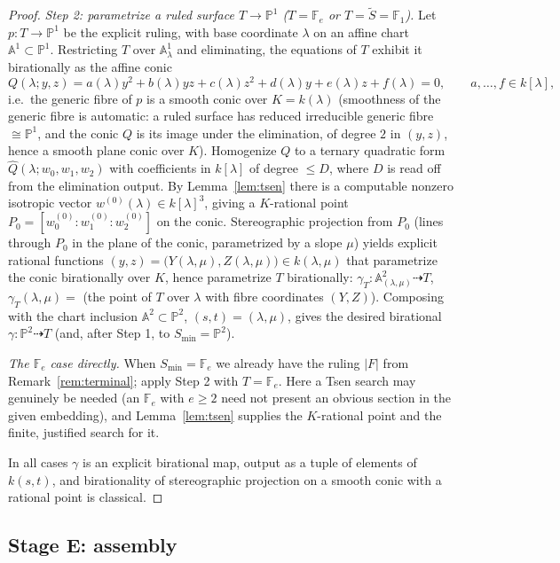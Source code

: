 \documentclass{amsart}
\theoremstyle{plain}
\theoremstyle{definition}
\newcommand{\PP}{\mathbb{P}}
\newcommand{\AA}{\mathbb{A}}
\begin{document}
\begin{proof}
\medskip
\emph{Step 2: parametrize a ruled surface $T\to\PP^1$ ($T=\mathbb F_e$ or
$T=\widetilde S=\mathbb F_1$).}
Let $p\colon T\to\PP^1$ be the explicit ruling, with base coordinate $\lambda$ on
an affine chart $\AA^1\subset\PP^1$.  Restricting $T$ over $\AA^1_\lambda$ and
eliminating, the equations of $T$ exhibit it birationally as the affine conic
\[
Q(\lambda;y,z)=a(\lambda)y^2+b(\lambda)yz+c(\lambda)z^2+d(\lambda)y+e(\lambda)z
+f(\lambda)=0,\qquad a,\dots,f\in k[\lambda],
\]
i.e.\ the generic fibre of $p$ is a smooth conic over $K=k(\lambda)$ (smoothness
of the generic fibre is automatic: a ruled surface has reduced irreducible
generic fibre $\cong\PP^1$, and the conic $Q$ is its image under the elimination,
of degree $2$ in $(y,z)$, hence a smooth plane conic over $K$).  Homogenize $Q$
to a ternary quadratic form $\widehat Q(\lambda;w_0,w_1,w_2)$ with coefficients
in $k[\lambda]$ of degree $\le D$, where $D$ is read off from the elimination
output.  By Lemma~\ref{lem:tsen} there is a computable nonzero isotropic vector
$w^{(0)}(\lambda)\in k[\lambda]^3$, giving a $K$-rational point
$P_0=[w_0^{(0)}:w_1^{(0)}:w_2^{(0)}]$ on the conic.  Stereographic projection
from $P_0$ (lines through $P_0$ in the plane of the conic, parametrized by a
slope $\mu$) yields explicit rational functions
$(y,z)=\big(Y(\lambda,\mu),Z(\lambda,\mu)\big)\in k(\lambda,\mu)$ that
parametrize the conic birationally over $K$, hence parametrize $T$ birationally:
$\gamma_T\colon \AA^2_{(\lambda,\mu)}\dashrightarrow T$,
$\gamma_T(\lambda,\mu)=$ (the point of $T$ over $\lambda$ with fibre coordinates
$(Y,Z)$).  Composing with the chart inclusion $\AA^2\subset\PP^2$,
$(s,t)=(\lambda,\mu)$, gives the desired birational
$\gamma\colon\PP^2\dashrightarrow T$ (and, after Step 1, to $S_{\min}=\PP^2$).

\medskip
\emph{The $\mathbb F_e$ case directly.}  When $S_{\min}=\mathbb F_e$ we already
have the ruling $|F|$ from Remark~\ref{rem:terminal}; apply Step 2 with $T=\mathbb
F_e$.  Here a Tsen search may genuinely be needed (an $\mathbb F_e$ with $e\ge 2$
need not present an obvious section in the given embedding), and
Lemma~\ref{lem:tsen} supplies the $K$-rational point and the finite, justified
search for it.

In all cases $\gamma$ is an explicit birational map, output as a tuple of
elements of $k(s,t)$, and birationality of stereographic projection on a smooth
conic with a rational point is classical.
\end{proof}

\subsection{Stage E: assembly}
\end{document}
